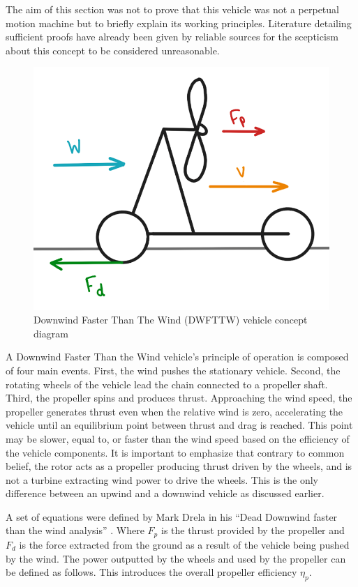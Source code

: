 The aim of this section was not to prove that this vehicle was not a perpetual motion machine but to briefly explain its working principles. Literature detailing sufficient proofs have already been given by reliable sources for the scepticism about this concept to be considered unreasonable.

\begin{figure}[!htbp]
    \centering
    \includegraphics{images/part4/simplediag.png}
    \caption{Downwind Faster Than The Wind (DWFTTW) vehicle concept diagram}
    \label{fig:diagram}
\end{figure}

A Downwind Faster Than the Wind vehicle’s principle of operation is composed of four main events. First, the wind pushes the stationary vehicle. Second, the rotating wheels of the vehicle lead the chain connected to a propeller shaft. Third, the propeller spins and produces thrust. Approaching the wind speed, the propeller generates thrust even when the relative wind is zero, accelerating the vehicle until an equilibrium point between thrust and drag is reached. This point may be slower, equal to, or faster than the wind speed based on the efficiency of the vehicle components. It is important to emphasize that contrary to common belief, the rotor acts as a propeller producing thrust driven by the wheels, and is not a turbine extracting wind power to drive the wheels. This is the only difference between an upwind and a downwind vehicle as discussed earlier.

A set of equations were defined by Mark Drela in his “Dead Downwind faster than the wind analysis” \cite{drela20dead}. Where $F_p$ is the thrust provided by the propeller and $F_d$ is the force extracted from the ground as a result of the vehicle being pushed by the wind. The power outputted by the wheels and used by the propeller can be defined as follows. This introduces the overall propeller efficiency $\eta_p$.

